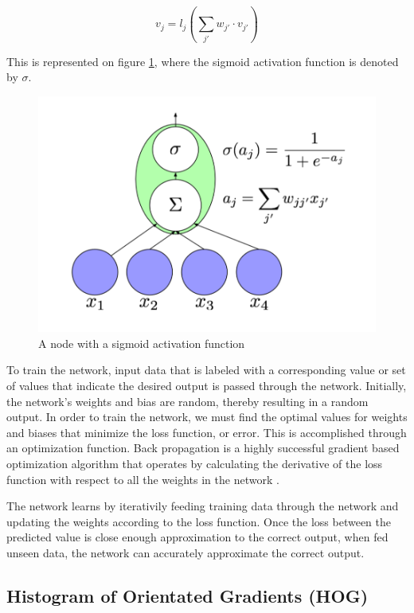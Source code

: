 \documentclass{article}
\begin{document}
\begin{equation}
v_j=l_j(\sum_{j'}w_{j'} \cdot v_{j'})
\end{equation}


This is represented on figure \ref{fig:node}, where the sigmoid activation function is denoted by \(\sigma\). 


\begin{figure}
\centering
\includegraphics[width=0.8\linewidth]{node.png}
\caption{A node with a sigmoid activation function}
\label{fig:node}
\end{figure}

To train the network, input data that is labeled with a corresponding value or set of values that indicate the desired output is passed through the network. Initially, the network's weights and bias are random, thereby resulting in a random output. In order to train the network, we must find the optimal values for weights and biases that minimize the loss function, or error. This is accomplished through an optimization function. Back propagation is a highly successful gradient based optimization algorithm that operates by calculating the derivative of the loss function with respect to all the weights in the network \cite{LSTM2}.


The network learns by iterativily feeding training data through the network and updating the weights according to the loss function. Once the loss between the predicted value is close enough approximation to the correct output, when fed unseen data, the network can accurately approximate the correct output. 

\subsection{\label{sec:level2}Histogram of Orientated Gradients (HOG)}
\end{document}
